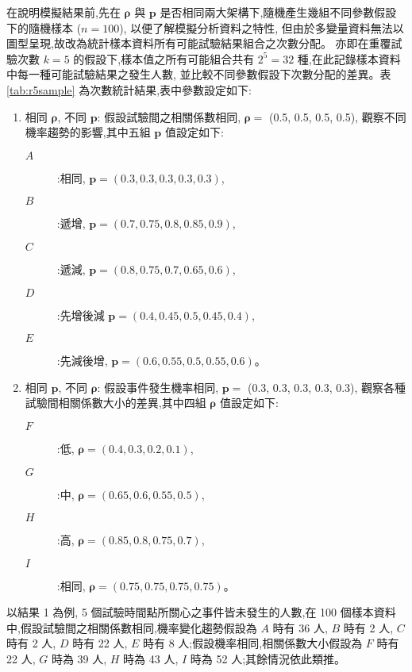 在說明模擬結果前,先在 $\bm{\rho}$ 與 $\bm{p}$ 是否相同兩大架構下,隨機產生幾組不同參數假設下的隨機樣本 ($n=100$), 以便了解模擬分析資料之特性,
但由於多變量資料無法以圖型呈現,故改為統計樣本資料所有可能試驗結果組合之次數分配。
亦即在重覆試驗次數 $k=5$ 的假設下,樣本值之所有可能組合共有 $2^5=32$ 種,在此記錄樣本資料中每一種可能試驗結果之發生人數,
並比較不同參數假設下次數分配的差異。表~ \ref{tab:r5sample} 為次數統計結果,表中參數設定如下:
\begin{enumerate}\label{r5t}
  \item 相同 $\bm{\rho}$, 不同 $\bm{p}$: 假設試驗間之相關係數相同, $\bm{\rho}=$ (0.5, 0.5, 0.5, 0.5), 觀察不同機率趨勢的影響,其中五組 $\bm{p}$ 值設定如下:
    \begin{description}
         \item [$A$]:相同, $\bm{p}=(0.3, 0.3, 0.3, 0.3, 0.3)$,
         \item [$B$]:遞增, $\bm{p}=(0.7, 0.75, 0.8, 0.85, 0.9)$,
         \item [$C$]:遞減, $\bm{p}=(0.8, 0.75, 0.7, 0.65, 0.6)$,
         \item [$D$]:先增後減 $\bm{p}=(0.4, 0.45, 0.5, 0.45, 0.4)$,
         \item [$E$]:先減後增, $\bm{p}=(0.6, 0.55, 0.5, 0.55, 0.6)$。
    \end{description}
  \item 相同 $\bm{p}$, 不同 $\bm{\rho}$: 假設事件發生機率相同, $\bm{p}=$ (0.3, 0.3, 0.3, 0.3, 0.3), 觀察各種試驗間相關係數大小的差異,其中四組 $\bm{\rho}$ 值設定如下:
     \begin{description}
         \item [$F$]:低, $\bm{\rho}=(0.4, 0.3, 0.2, 0.1)$,
         \item [$G$]:中, $\bm{\rho}=(0.65, 0.6, 0.55, 0.5)$,
         \item [$H$]:高, $\bm{\rho}=(0.85, 0.8, 0.75, 0.7)$,
         \item [$I$]:相同, $\bm{\rho}=(0.75, 0.75, 0.75, 0.75)$。
      \end{description}
   \end{enumerate}
以結果 1 為例, 5 個試驗時間點所關心之事件皆未發生的人數,在 100 個樣本資料中,假設試驗間之相關係數相同,機率變化趨勢假設為 $A$ 時有 36 人, $B$ 時有 2 人, $C$ 時有 2 人,
 $D$ 時有 22 人, $E$ 時有 8 人;假設機率相同,相關係數大小假設為 $F$ 時有 22 人, $G$ 時為 39 人,  $H$ 時為 43 人, $I$ 時為 52 人;其餘情況依此類推。

